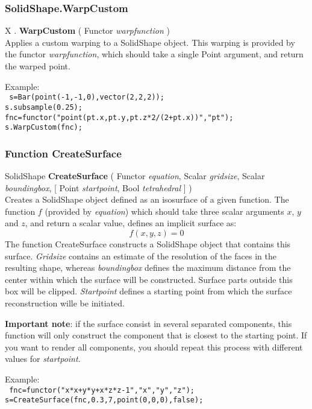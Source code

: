 \documentclass[10pt]{book}
\newcommand{\sourcecode}[1]{\texttt{#1}}
\newcommand{\var}[1]{\textit{#1}}
\begin{document}
\subsubsection{SolidShape.WarpCustom \label{F:SolidShape:WarpCustom}}
X . \textbf{WarpCustom} ( Functor \textit{warpfunction} ) \\
Applies a custom warping to a SolidShape object. This warping is provided by the functor \var{warpfunction}, which should take a single Point argument, and return the warped point.

Example: \\
\sourcecode{
s=Bar(point(-1,-1,0),vector(2,2,2)); \\
s.subsample(0.25); \\
fnc=functor("point(pt.x,pt.y,pt.z*2/(2+pt.x))","pt"); \\
s.WarpCustom(fnc); \\
}

\subsubsection{Function CreateSurface \label{F:CreateSurface}}
SolidShape \textbf{CreateSurface} ( Functor \textit{equation}, Scalar \textit{gridsize}, Scalar \textit{boundingbox},  [ Point \textit{startpoint}, Bool \textit{tetrahedral} ] ) \\
Creates a SolidShape object defined as an isosurface of a given function. The function $f$ (provided by \var{equation}) which should take three scalar arguments $x$, $y$ and $z$, and return a scalar value, defines an implicit surface as:
\begin{equation}
f(x,y,z)=0
\end{equation}
The function CreateSurface constructs a SolidShape object that contains this surface. \var{Gridsize} contains an estimate of the resolution of the faces in the resulting shape, whereas \var{boundingbox} defines the maximum distance from the center within which the surface will be constructed. Surface parts outside this box will be clipped. \var{Startpoint} defines a starting point from which the surface reconstruction wille be initiated.

\textbf{Important note}: if the surface consist in several separated components, this function will only construct the component that is closest to the starting point. If you want to render all components, you should repeat this process with different values for \var{startpoint}.

Example: \\
\sourcecode{
fnc=functor("x*x+y*y+x*z*z-1","x","y","z"); \\
s=CreateSurface(fnc,0.3,7,point(0,0,0),false); \\
}
\end{document}
